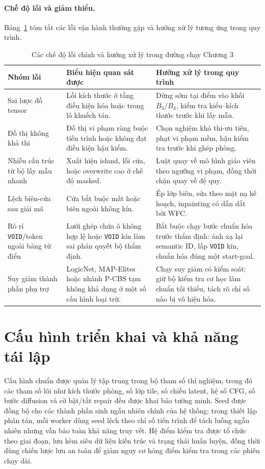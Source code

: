\documentclass[oneside,a4paper,12pt]{extreport}
\begin{document}
\paragraph{Chế độ lỗi và giảm thiểu.}
Bảng~\ref{tab:failure_modes_ch3} tóm tắt các lỗi vận hành thường gặp và hướng xử lý tương ứng trong quy trình.

\begin{table}[H]
\centering
\caption{Các chế độ lỗi chính và hướng xử lý trong đường chạy Chương 3}
\label{tab:failure_modes_ch3}
\begin{tabular}{>{\raggedright\arraybackslash}p{3.0cm} >{\raggedright\arraybackslash}p{4.7cm} >{\raggedright\arraybackslash}p{5.1cm}}
\toprule
Nhóm lỗi & Biểu hiện quan sát được & Hướng xử lý trong quy trình \\
\midrule
Sai lược đồ tensor & Lỗi kích thước ở tầng điều kiện hóa hoặc trong lô khuếch tán. & Dừng sớm tại điểm vào khối $B_3/B_4$, kiểm tra kiểu--kích thước trước khi lấy mẫu. \\
Đồ thị không khả thi & Đồ thị vi phạm ràng buộc tiến trình hoặc không đạt điều kiện hậu kiểm. & Chọn nghiệm khả thi-ưu tiên, phạt vi phạm mềm, hậu kiểm tra trước khi ghép phòng. \\
Nhiễu cấu trúc từ bộ lấy mẫu nhanh & Xuất hiện island, lỗi cửa, hoặc overwrite cao ở chế độ masked. & Luật quay về mô hình giáo viên theo ngưỡng vi phạm, đồng thời chặn quay về đệ quy. \\
Lệch biên-cửa sau giải mã & Cửa bắt buộc mất hoặc biên ngoài không kín. & Ép lớp biên, sửa theo mặt nạ kế hoạch, inpainting có dẫn dắt bởi WFC. \\
Rò rỉ \texttt{VOID}/token ngoài bảng từ điển & Lưới ghép chứa ô không hợp lệ hoặc \texttt{VOID} kín làm sai phán quyết bộ thẩm định. & Bắt buộc chạy bước chuẩn hóa trước thẩm định: ánh xạ lại semantic ID, lấp \texttt{VOID} kín, chuẩn hóa đúng một start-goal. \\
Suy giảm thành phần phụ trợ & LogicNet, MAP-Elites hoặc nhánh P-CBS tạm không khả dụng ở một số cấu hình loại trừ. & Chạy suy giảm có kiểm soát: giữ bộ kiểm tra cơ học làm chuẩn tối thiểu, tách rõ chỉ số nào bị vô hiệu hóa. \\
\bottomrule
\end{tabular}
\end{table}

\section{Cấu hình triển khai và khả năng tái lập}
Cấu hình chuẩn được quản lý tập trung trong bộ tham số thí nghiệm, trong đó các tham số lõi như kích thước phòng, số lớp tile, số chiều latent, hệ số CFG, số bước diffusion và cờ bật/tắt repair đều được khai báo tường minh. Seed được đồng bộ cho các thành phần sinh ngẫu nhiên chính của hệ thống; trong thiết lập phân tán, mỗi worker dùng seed lệch theo chỉ số tiến trình để tách luồng ngẫu nhiên nhưng vẫn bảo toàn khả năng truy vết. Hệ điểm kiểm tra được tổ chức theo giai đoạn, lưu kèm siêu dữ liệu kiến trúc và trạng thái huấn luyện, đồng thời dùng chiến lược lưu an toàn để giảm nguy cơ hỏng điểm kiểm tra trong các phiên chạy dài.
\end{document}
